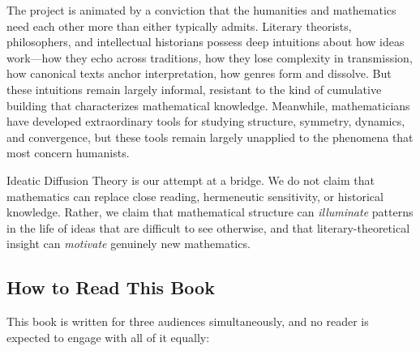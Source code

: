 \documentclass[11pt,openany]{book}
\theoremstyle{definition}
\theoremstyle{plain}
\theoremstyle{remark}
\begin{document}
The project is animated by a conviction that the humanities and mathematics need each other more than either typically admits. Literary theorists, philosophers, and intellectual historians possess deep intuitions about how ideas work---how they echo across traditions, how they lose complexity in transmission, how canonical texts anchor interpretation, how genres form and dissolve. But these intuitions remain largely informal, resistant to the kind of cumulative building that characterizes mathematical knowledge. Meanwhile, mathematicians have developed extraordinary tools for studying structure, symmetry, dynamics, and convergence, but these tools remain largely unapplied to the phenomena that most concern humanists.

Ideatic Diffusion Theory is our attempt at a bridge. We do not claim that mathematics can replace close reading, hermeneutic sensitivity, or historical knowledge. Rather, we claim that mathematical structure can \emph{illuminate} patterns in the life of ideas that are difficult to see otherwise, and that literary-theoretical insight can \emph{motivate} genuinely new mathematics.

\subsection*{How to Read This Book}

This book is written for three audiences simultaneously, and no reader is expected to engage with all of it equally:
\end{document}
